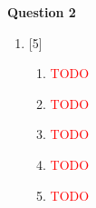 \par
\noindent
\textbf{Question 2}\\
\begin{enumerate}[label=(\roman*)]

    \item \hfill [5]
        \begin{enumerate}[label=(\alph*)]
            \item \textcolor{red}{TODO} 
            \item \textcolor{red}{TODO} 
            \item \textcolor{red}{TODO} 
            \item \textcolor{red}{TODO} 
            \item \textcolor{red}{TODO} 
        \end{enumerate}

\end{enumerate}

